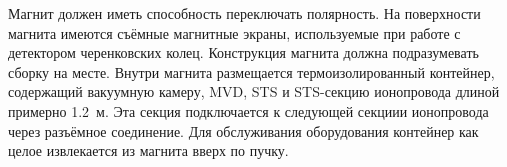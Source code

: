 Магнит должен иметь способность переключать полярность.
На поверхности магнита имеются съёмные магнитные экраны, используемые при работе с детектором черенковских колец. %
Конструкция магнита должна подразумевать сборку на месте.
Внутри магнита размещается термоизолированный контейнер, содержащий вакуумную камеру, MVD, STS и STS-секцию ионопровода длиной примерно 1.2~м. Эта секция подключается к следующей секциии ионопровода через разъёмное соединение. Для обслуживания оборудования контейнер как целое извлекается из магнита вверх по пучку.



